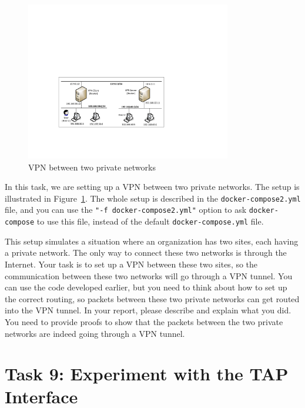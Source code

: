 \begin{figure}[htb]
\begin{center}
\includegraphics[width=0.8\textwidth]{Figs/VPN_3lans.pdf}
\end{center}
\caption{VPN between two private networks}
\label{vpn:fig:two-private-network}
\end{figure}
 
In this task, we are setting up a VPN between two private networks.
The setup is illustrated in Figure~\ref{vpn:fig:two-private-network}.
The whole setup is described in the \texttt{docker-compose2.yml} file, 
and you can use the \texttt{"-f docker-compose2.yml"} option to ask
\texttt{docker-compose} to use this file, instead of the 
default \texttt{docker-compose.yml} file. 


This setup simulates a situation where an organization has two sites, 
each having a private network. The only way to connect these two
networks is through the Internet. 
Your task is to set up a VPN between these two sites, so
the communication between these two networks will go 
through a VPN tunnel. You can use the code developed earlier,
but you need to think about how to set up the correct routing,
so packets between these two private networks can 
get routed into the VPN tunnel. 
In your report, please describe and explain what you did.
You need to provide proofs to show that the packets 
between the two private networks are indeed going through
a VPN tunnel. 


\section{Task 9: Experiment with the TAP Interface}


